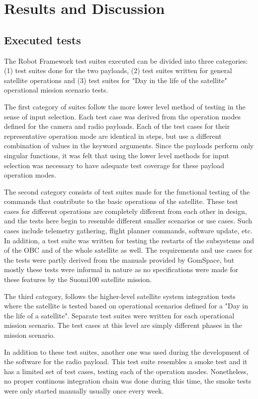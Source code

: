 \documentclass[english,12pt,a4paper,pdftex,elec,utf8]{aaltothesis}
\begin{document}
\section{Results and Discussion}
\subsection{Executed tests}
The Robot Framework test suites executed can be divided into three categories: (1) test suites done for the two payloads, (2) test suites written for general satellite operations and (3) test suites for "Day in the life of the satellite" operational mission scenario tests. \par 
The first category of suites follow the more lower level method of testing in the sense of input selection. Each test case was derived from the operation modes defined for the camera and radio payloads. Each of the test cases for their representative operation mode are identical in steps, but use a different combination of values in the keyword arguments. Since the payloads perform only singular functions, it was felt that using the lower level methods for input selection was necessary to have adequate test coverage for these payload operation modes. \par
The second category consists of test suites made for the functional testing of the commands that contribute to the basic operations of the satellite. These test cases for different operations are completely different from each other in design, and the tests here begin to resemble different smaller scenarios or use cases. Such cases include telemetry gathering, flight planner commands, software update, etc. In addition, a test suite was written for testing the restarts of the subsystems and of the OBC and of the whole satellite as well. The requirements and use cases for the tests were partly derived from the manuals provided by GomSpace, but mostly these tests were informal in nature as no specifications were made for these features by the Suomi100 satellite mission.\par 
The third category, follows the higher-level satellite system integration tests where the satellite is tested based on operational scenarios defined for a "Day in the life of a satellite". Separate test suites were written for each operational mission scenario. The test cases at this level are simply different phases in the mission scenario.\par
In addition to these test suites, another one was used during the development of the software for the radio payload. This test suite resembles a smoke test and it has a limited set of test cases, testing each of the operation modes. Nonetheless, no proper continous integration chain was done during this time, the smoke tests were only started manually usually once every week.\par   
\end{document}
